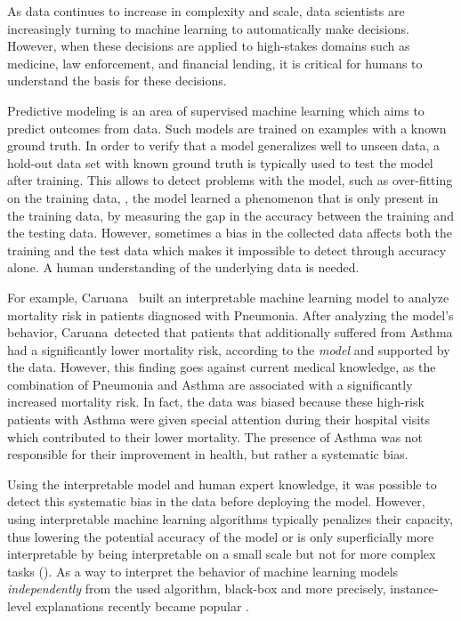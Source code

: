 As data continues to increase in complexity and scale, data scientists are increasingly turning to machine learning to automatically make decisions.  However, when these decisions are applied to high-stakes domains such as medicine, law enforcement, and financial lending, it is critical for humans to understand the basis for these decisions.


Predictive modeling is an area of supervised machine learning which aims to predict outcomes from data.
Such models are trained on examples with a known ground truth.  In order to verify that a model generalizes well to unseen data, a hold-out data set with known ground truth is typically used to test the model after training.
This allows to detect problems with the model, such as over-fitting on the training data, \ie, the model learned a phenomenon that is only present in the training data, by measuring the gap in the accuracy between the training and the testing data.
However, sometimes a bias in the collected data affects both the training and the test data which makes it impossible to detect through accuracy alone.
A human understanding of the underlying data is needed.

For example, Caruana~\etal\cite{Caruana:2015:IMH:2783258.2788613} built an interpretable machine learning model to analyze mortality risk in patients diagnosed with Pneumonia.
After analyzing the model's behavior, Caruana~\etal detected that patients that additionally suffered from Asthma had a significantly lower mortality risk, according to the \emph{model} and supported by the data.
However, this finding goes against current medical knowledge, as the combination of Pneumonia and Asthma are associated with a significantly increased mortality risk.
In fact, the data was biased because these high-risk patients with Asthma were given special attention during their hospital visits which contributed to their lower mortality.  The presence of Asthma was not responsible for their improvement in health, but rather a systematic bias. 

Using the interpretable model and human expert knowledge, it was possible to detect this systematic bias in the data before deploying the model.
However, using interpretable machine learning algorithms typically penalizes their capacity, thus lowering the potential accuracy of the model \cite{Caruana:2015:IMH:2783258.2788613} or is only superficially more interpretable by being interpretable on a small scale but not for more complex tasks (\cite{2016arXiv160603490L,2016arXiv160605685K}).
As a way to interpret the behavior of machine learning models \emph{independently} from the used algorithm, black-box and more precisely, instance-level explanations recently became popular \cite{Martens:2014:EDD:2600518.2600523,DBLP:journals/corr/RibeiroSG16,krause2016interacting}.

